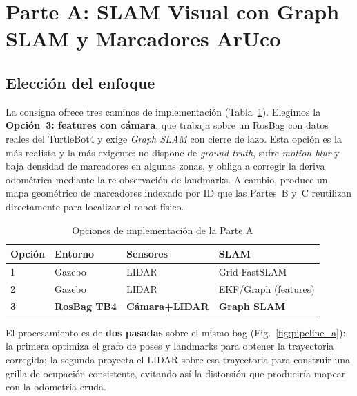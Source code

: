 \section{Parte A: SLAM Visual con Graph SLAM y Marcadores ArUco}
\label{sec:parte_a}

\subsection{Elección del enfoque}
La consigna ofrece tres caminos de implementación (Tabla~\ref{tab:opciones_a}). Elegimos la \textbf{Opción~3: features con cámara}, que trabaja sobre un RosBag con datos reales del TurtleBot4 y exige \emph{Graph SLAM} con cierre de lazo. Esta opción es la más realista y la más exigente: no dispone de \emph{ground truth}, sufre \emph{motion blur} y baja densidad de marcadores en algunas zonas, y obliga a corregir la deriva odométrica mediante la re-observación de landmarks. A cambio, produce un mapa geométrico de marcadores indexado por ID que las Partes~B y~C reutilizan directamente para localizar el robot físico.

\begin{table}[h]
\centering
\caption{Opciones de implementación de la Parte A}
\label{tab:opciones_a}
\begin{tabular}{llll}
\toprule
\textbf{Opción} & \textbf{Entorno} & \textbf{Sensores} & \textbf{SLAM} \\
\midrule
1 & Gazebo & LIDAR & Grid FastSLAM \\
2 & Gazebo & LIDAR & EKF/Graph (features) \\
\textbf{3} & \textbf{RosBag TB4} & \textbf{Cámara+LIDAR} & \textbf{Graph SLAM} \\
\bottomrule
\end{tabular}
\end{table}

El procesamiento es de \textbf{dos pasadas} sobre el mismo bag (Fig.~\ref{fig:pipeline_a}): la primera optimiza el grafo de poses y landmarks para obtener la trayectoria corregida; la segunda proyecta el LIDAR sobre esa trayectoria para construir una grilla de ocupación consistente, evitando así la distorsión que produciría mapear con la odometría cruda.

